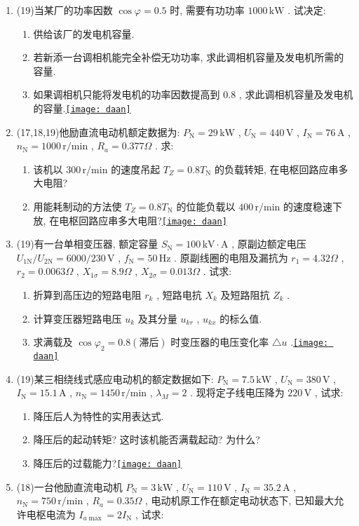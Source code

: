\documentclass[lang=cn,11pt,marginpar=margintrue]{elegantbook}%
\newcommand{\daan}[1]{\hfill\hyperref[#1]{\texttt{[image: daan]}}}
\newcommand{\zt}[1]{\,\mathrm{#1}}
\newcommand{\NN}{\mathrm{N}}
\begin{document}
\begin{enumerate}
	\item (19)当某厂的功率因数 $\cos\varphi=0.5$ 时, 需要有功功率 $1000\zt{kW}$ . 试决定:
		\begin{enumerate}
			\item 供给该厂的发电机容量.
			\item 若新添一台调相机能完全补偿无功功率, 求此调相机容量及发电机所需的容量.
			\item 如果调相机只能将发电机的功率因数提高到 $0.8$ , 求此调相机容量及发电机的容量.\daan{js:9}
		\end{enumerate}
	\item (17,18,19)他励直流电动机额定数据为: $P_{\NN}=29\zt{kW}$ , $U_{\NN}=440\zt{V}$ , $I_{\NN}=76\zt{A}$ , $n_{\NN}=1000\zt{r/min}$ , $R_a=0.377\Omega$ . 求:
		\begin{enumerate}
			\item 该机以 $300\zt{r/min}$ 的速度吊起 $T_Z=0.8T_{\NN}$ 的负载转矩, 在电枢回路应串多大电阻?
			\item 用能耗制动的方法使 $T_Z=0.8T_{\NN}$ 的位能负载以 $400\zt{r/min}$ 的速度稳速下放, 在电枢回路应串多大电阻?\daan{js:10}
		\end{enumerate}
	\item  (19)有一台单相变压器, 额定容量 $S_{\NN}=100\zt{kV\cdot A}$ , 原副边额定电压 $U_{1\NN}/U_{2\NN}=6000/230\zt{V}$ , $f_{\NN}=50\zt{Hz}$ . 原副线圈的电阻及漏抗为 $r_1=4.32\Omega$ , $r_2=0.0063\Omega$ , $X_{1\sigma}=8.9\Omega$ , $X_{2\sigma}=0.013\Omega$ . 试求:
		\begin{enumerate}
			\item 折算到高压边的短路电阻 $r_k$ , 短路电抗 $X_k$ 及短路阻抗 $Z_k$ .
			\item 计算变压器短路电压 $u_k$ 及其分量 $u_{kr}$ , $u_{kx}$ 的标么值.
			\item 求满载及 $\cos\varphi_2=0.8(\text{滞后})$ 时变压器的电压变化率 $\triangle u$ .\daan{js:11}
		\end{enumerate}
	\item (19)某三相绕线式感应电动机的额定数据如下: $P_{\NN}=7.5\zt{kW}$ , $U_{\NN}=380\zt{V}$ , $I_{\NN}=15.1\zt{A}$ , $n_{\NN}=1450\zt{r/min}$ , $\lambda_{M}=2$ . 现将定子线电压降为 $220\zt{V}$ , 试求:
		\begin{enumerate}
			\item 降压后人为特性的实用表达式.
			\item 降压后的起动转矩? 这时该机能否满载起动? 为什么?
			\item 降压后的过载能力?\daan{js:12}
		\end{enumerate}
	\item (18)一台他励直流电动机 $P_{\NN}=3\zt{kW}$ , $U_{\NN}=110\zt{V}$ , $I_{\NN}=35.2\zt{A}$ , $n_{\NN}=750\zt{r/min}$ , $R_a=0.35\Omega$ , 电动机原工作在额定电动状态下, 已知最大允许电枢电流为 $I_{a\max}=2I_{\NN}$ , 试求:

\end{enumerate}
\end{document}
